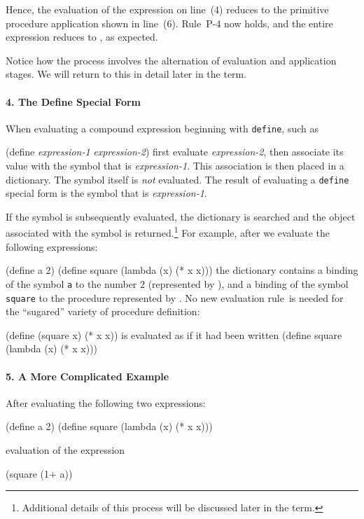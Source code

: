 Hence, the evaluation of the expression on line~(4) reduces to the
primitive procedure application shown in line~(6). Rule~P-4 now
holds, and the entire expression reduces to , as expected.

Notice how the process involves the alternation of evaluation and
application stages. We will return to this in detail later in the term.

\paragraph{4. The Define Special Form}

When evaluating a compound expression beginning with {\tt define}, such as

\beginlisp
(define {\it expression-1} {\it expression-2})
\endlisp
first evaluate {\it expression-2}, then associate its value with the
symbol that is {\it expression-1}. This association is then placed 
in a dictionary. The symbol itself is {\it not} evaluated.
The result of evaluating a {\tt define} special form is the symbol 
that is {\it expression-1}.

If the symbol is subsequently evaluated, the dictionary is searched 
and the object associated with the symbol is 
returned.\footnote{Additional details of this process will be discussed
later in the term.} For example, after we evaluate the following expressions:

\beginlisp
(define a 2)
\null
(define square (lambda (x) (* x x)))
\endlisp
the dictionary contains a binding of the symbol {\tt a} to the
number $2$ (represented by ), and a binding of the symbol 
{\tt square} to the procedure represented by .
No new evaluation
rule~is needed for the ``sugared'' variety of procedure definition:

\beginlisp 
(define (square x) (* x x))
\endlisp 
is evaluated as if it had been written
\beginlisp 
(define square (lambda (x) (* x x)))
\endlisp 

\paragraph{5.  A More Complicated Example}

After evaluating the following two expressions:

\beginlisp
(define a 2)
\null
(define square (lambda (x) (* x x)))
\endlisp

evaluation of the expression

\beginlisp
(square (1+ a))
\endlisp

